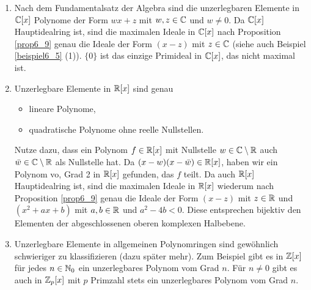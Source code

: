 \begin{beispiel}\label{beispiel6_10}
	\begin{enumerate}[label=(\arabic*)]
		\item Nach dem Fundamentalsatz der Algebra sind die unzerlegbaren Elemente in $\mathbb{C}[x]$ Polynome der Form $wx + z$ mit $w,z \in \mathbb{C}$ und $w \neq 0$. Da $\mathbb{C}[x]$ Hauptidealring ist, sind die maximalen Ideale in $\mathbb{C}[x]$ nach Proposition \ref{prop6_9} genau die Ideale der Form $(x-z)$ mit $z \in \mathbb{C}$ (siehe auch Beispiel \ref{beispiel6_5} (1)). $\{0\}$ ist das einzige Primideal in $\mathbb{C}[x]$, das nicht maximal ist.
		\item Unzerlegbare Elemente in $\mathbb{R}[x]$ sind genau 
		\begin{itemize}
			\item lineare Polynome,
			\item quadratische Polynome ohne reelle Nullstellen.
		\end{itemize}
		Nutze dazu, dass ein Polynom $f \in \mathbb{R}[x]$ mit Nullstelle $w \in \mathbb{C} \setminus \mathbb{R}$ auch $\bar{w} \in \mathbb{C}\setminus\mathbb{R}$ als Nullstelle hat. Da $(x-w)(x-\bar{w}) \in \mathbb{R}[x]$, haben wir ein Polynom vo, Grad 2 in $\mathbb{R}[x]$ gefunden, das $f$ teilt. Da auch $\mathbb{R}[x]$ Hauptidealring ist, sind die maximalen Ideale in $\mathbb{R}[x]$ wiederum nach Proposition \ref{prop6_9} genau die Ideale der Form $(x-z)$ mit $z \in \mathbb{R}$ und $(x^2 + ax + b)$ mit $a,b \in \mathbb{R}$ und $a^2 - 4b < 0$. Diese entsprechen bijektiv den Elementen der abgeschlossenen oberen komplexen Halbebene.
		\item Unzerlegbare Elemente in allgemeinen Polynomringen sind gewöhnlich schwieriger zu klassifizieren (dazu später mehr). Zum Beispiel gibt es in $\mathbb{Z}[x]$ für jedes $n \in \mathbb{N}_0$ ein unzerlegbares Polynom vom Grad $n$. Für $n \neq 0$ gibt es auch in $\mathbb{Z}_p[x]$ mit $p$ Primzahl stets ein unzerlegbares Polynom vom Grad $n$.
	\end{enumerate}
\end{beispiel}

